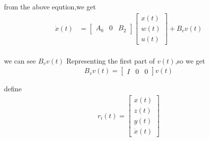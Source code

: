 \documentclass[twocolumn]{autart}    %
\begin{document}
from the above eqution,we get
\begin{equation}
    \begin{aligned}
            \dot{x}(t) 
        & = \begin{bmatrix}
            A_{0} & 0 & B_{2}
        \end{bmatrix}\begin{bmatrix}
            x(t) \\
            w(t) \\
            u(t) 
        \end{bmatrix} + 
            B_{v} v(t)\\
    \end{aligned}
\end{equation}

we can see $B_{v}v(t)$ Representing the first part of $v(t)$,so we get
\begin{equation}
    \begin{aligned}
            B_{v} v(t) = \begin{bmatrix}
                I & 0 & 0
            \end{bmatrix}v(t)
    \end{aligned}
\end{equation}

define 
\begin{equation}
    \begin{aligned}
        r_{i}(t) = \begin{bmatrix}
            x(t) \\
            z(t) \\
            y(t) \\
            \dot{x}(t)
        \end{bmatrix} 
    \end{aligned}
\end{equation}
\end{document}
